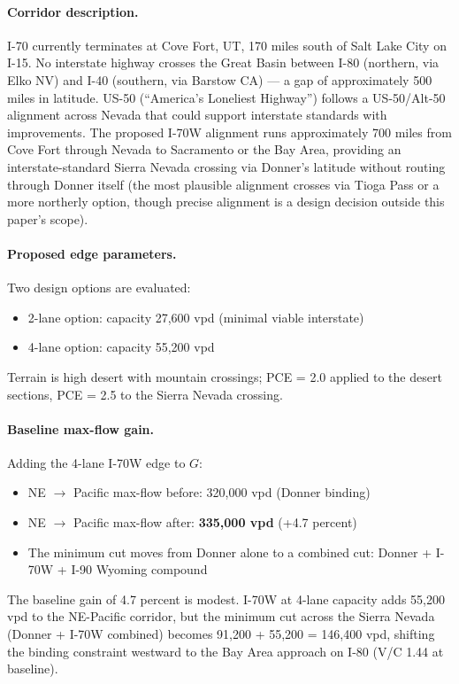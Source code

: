 \paragraph{Corridor description.} I-70 currently terminates at Cove Fort, UT, 170 miles south of Salt Lake City on I-15. No interstate highway crosses the Great Basin between I-80 (northern, via Elko NV) and I-40 (southern, via Barstow CA) --- a gap of approximately 500 miles in latitude. US-50 (``America's Loneliest Highway'') follows a US-50/Alt-50 alignment across Nevada that could support interstate standards with improvements. The proposed I-70W alignment runs approximately 700 miles from Cove Fort through Nevada to Sacramento or the Bay Area, providing an interstate-standard Sierra Nevada crossing via Donner's latitude without routing through Donner itself (the most plausible alignment crosses via Tioga Pass or a more northerly option, though precise alignment is a design decision outside this paper's scope).

\paragraph{Proposed edge parameters.} Two design options are evaluated:
\begin{itemize}
  \item 2-lane option: capacity 27,600 vpd (minimal viable interstate)
  \item 4-lane option: capacity 55,200 vpd
\end{itemize}
Terrain is high desert with mountain crossings; PCE = 2.0 applied to the desert sections, PCE = 2.5 to the Sierra Nevada crossing.

\paragraph{Baseline max-flow gain.} Adding the 4-lane I-70W edge to $G$:
\begin{itemize}
  \item NE $\to$ Pacific max-flow before: 320,000 vpd (Donner binding)
  \item NE $\to$ Pacific max-flow after: \textbf{335,000 vpd} (+4.7 percent)
  \item The minimum cut moves from Donner alone to a combined cut: Donner + I-70W + I-90 Wyoming compound
\end{itemize}
The baseline gain of 4.7 percent is modest. I-70W at 4-lane capacity adds 55,200 vpd to the NE-Pacific corridor, but the minimum cut across the Sierra Nevada (Donner + I-70W combined) becomes 91,200 + 55,200 = 146,400 vpd, shifting the binding constraint westward to the Bay Area approach on I-80 (V/C 1.44 at baseline).


